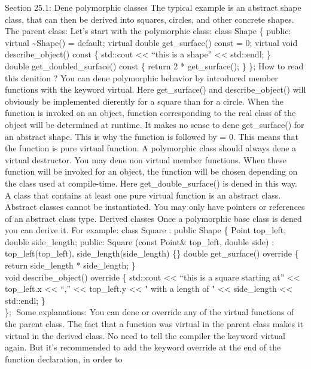 Section 25.1: Dene polymorphic classes The typical example is an
abstract shape class, that can then be derived into squares, circles,
and other concrete shapes. The parent class: Let's start with the
polymorphic class: class Shape \{ public: virtual
\textasciitilde Shape() = default; virtual double get\_surface() const =
0; virtual void describe\_object() const \{ std::cout
\textless\textless{} ``this is a shape'' \textless\textless{} std::endl;
\}\\
double get\_doubled\_surface() const \{ return 2 * get\_surface(); \}
\}; How to read this denition ? You can dene polymorphic behavior by
introduced member functions with the keyword virtual. Here
get\_surface() and describe\_object() will obviously be implemented
dierently for a square than for a circle. When the function is invoked
on an object, function corresponding to the real class of the object
will be determined at runtime. It makes no sense to dene get\_surface()
for an abstract shape. This is why the function is followed by = 0. This
means that the function is pure virtual function. A polymorphic class
should always dene a virtual destructor. You may dene non virtual member
functions. When these function will be invoked for an object, the
function will be chosen depending on the class used at compile-time.
Here get\_double\_surface() is dened in this way. A class that contains
at least one pure virtual function is an abstract class. Abstract
classes cannot be instantiated. You may only have pointers or references
of an abstract class type. Derived classes Once a polymorphic base class
is dened you can derive it. For example: class Square : public Shape \{
Point top\_left; double side\_length; public: Square (const Point\&
top\_left, double side) : top\_left(top\_left),
side\_length(side\_length) \{\} double get\_surface() override \{ return
side\_length * side\_length; \}\\
void describe\_object() override \{ std::cout \textless\textless{}
``this is a square starting at'' \textless\textless{} top\_left.x
\textless\textless{} ``,'' \textless\textless{} top\_left.y
\textless\textless{} " with a length of " \textless\textless{}
side\_length \textless\textless{} std::endl; \}\\
\}; Some explanations: You can dene or override any of the virtual
functions of the parent class. The fact that a function was virtual in
the parent class makes it virtual in the derived class. No need to tell
the compiler the keyword virtual again. But it's recommended to add the
keyword override at the end of the function declaration, in order to
